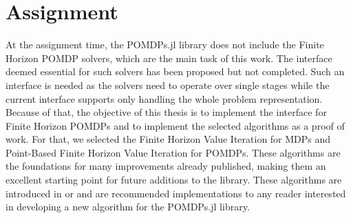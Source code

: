 



\section{Assignment}
At the assignment time, the POMDPs.jl library does not include the Finite Horizon POMDP solvers, which are the main task of this work. The interface deemed essential for such solvers has been proposed but not completed. Such an interface is needed as the solvers need to operate over single stages while the current interface supports only handling the whole problem representation. Because of that, the objective of this thesis is to implement the interface for Finite Horizon POMDPs and to implement the selected algorithms as a proof of work. For that, we selected the Finite Horizon Value Iteration for MDPs and Point-Based Finite Horizon Value Iteration for POMDPs. These algorithms are the foundations for many improvements already published, making them an excellent starting point for future additions to the library. These algorithms are introduced in \cite{Walraven19} or \cite{Shani2013} and are recommended implementations to any reader interested in developing a new algorithm for the POMDPs.jl library. 

